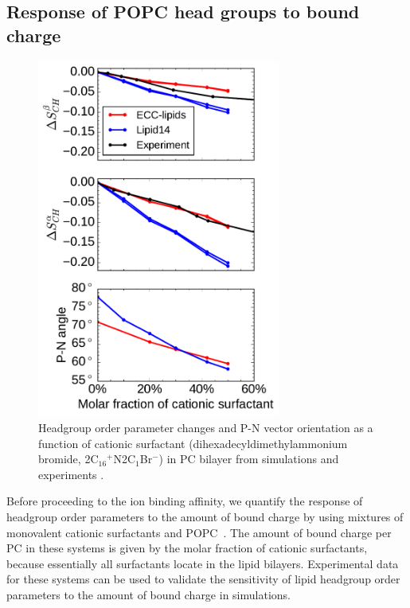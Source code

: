 \documentclass[aip,jcp,twocolumn]{revtex4}
\begin{document}

\subsection{Response of POPC head groups to bound charge}

\begin{figure}[tbp]
  \centering
  \includegraphics[width=8.0cm]{../Fig/ipython_nb/PN_angle_OrdPars-A-B_L14-ECCL17_q80_sig89_surf.pdf}
  \caption{\label{OrderParameterCHANGESsurf}
    Headgroup order parameter changes and P-N vector orientation as a function of
    cationic surfactant (dihexadecyldimethylammonium bromide, 2C$_{16}$$^+$N2C$_1$Br$^-$)
    in PC bilayer from simulations and experiments \cite{scherer89}.
  }
\end{figure}

Before proceeding to the ion binding affinity, we quantify
the response of headgroup order parameters to the amount of 
bound charge by using mixtures of monovalent cationic surfactants
and POPC~\cite{scherer89}. The amount of bound charge per PC 
in these systems is given by the molar fraction of cationic 
surfactants, because essentially all surfactants locate in the 
lipid bilayers. Experimental data for these systems can be used to validate 
the sensitivity of lipid headgroup order parameters
to the amount of bound charge in simulations.
\end{document}
